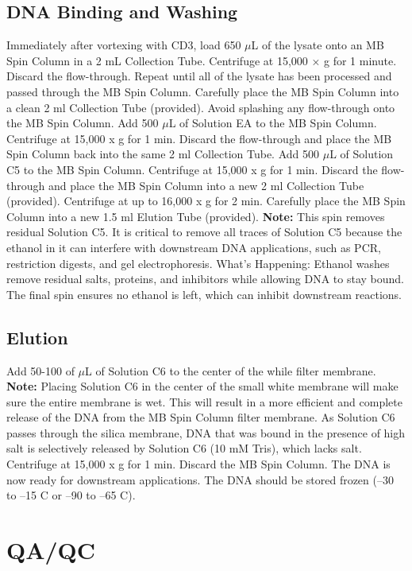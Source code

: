 \documentclass[12pt]{SOP5_beta}\usepackage[]{graphicx}\usepackage[]{xcolor}
\begin{document}
\subsection*{DNA Binding and Washing}
\NP Immediately after vortexing with CD3, load 650 $\mu$L of the lysate onto an MB Spin Column in a 2 mL Collection Tube.
\NP Centrifuge at 15,000 × g for 1 minute. Discard the flow-through.
Repeat until all of the lysate has been processed and passed through the MB Spin Column.
\NP Carefully place the MB Spin Column into a clean 2 ml Collection Tube (provided). Avoid splashing any flow-through onto the MB Spin Column.
\NP Add 500 $\mu$L of Solution EA to the MB Spin Column. Centrifuge at 15,000 x g for 1 min.
\NP Discard the flow-through and place the MB Spin Column back into the same 2 ml Collection Tube.
\NP Add 500 $\mu$L of Solution C5 to the MB Spin Column. Centrifuge at 15,000 x g for 1 min.
\NP Discard the flow-through and place the MB Spin Column into a new 2 ml Collection Tube (provided).
\NP Centrifuge at up to 16,000 x g for 2 min. Carefully place the MB Spin Column into a new 1.5 ml Elution Tube (provided). \textbf{Note:} This spin removes residual Solution C5. It is critical to remove all traces of
Solution C5 because the ethanol in it can interfere with downstream DNA applications, such as PCR, restriction digests, and gel electrophoresis.
\noindent What's Happening: Ethanol washes remove residual salts, proteins, and inhibitors while allowing DNA to stay bound. The final spin ensures no ethanol is left, which can inhibit downstream reactions.

\subsection*{Elution}
\NP Add 50-100 of $\mu$L of Solution C6 to the center of the while filter membrane. \textbf{Note:} Placing Solution C6 in the center of the small white membrane will make sure the entire membrane is wet. This will result in a more efficient and complete release of the DNA from the MB Spin Column filter membrane. As Solution C6 passes through the silica
membrane, DNA that was bound in the presence of high salt is selectively released by Solution C6 (10 mM Tris), which lacks salt.
\NP Centrifuge at 15,000 x g for 1 min. Discard the MB Spin Column. The DNA is now ready for downstream applications.
\NP The DNA should be stored frozen  (–30 to –15 \degree C or –90 to –65 \degree C).

\section{QA/QC}
\end{document}
